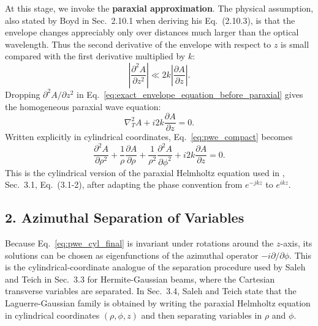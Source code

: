 \begin{resolucao}[Solution]
    At this stage, we invoke the \textbf{paraxial approximation}. The physical assumption, also stated by Boyd in Sec.~2.10.1 when deriving his Eq.~(2.10.3), is that the envelope changes appreciably only over distances much larger than the optical wavelength. Thus the second derivative of the envelope with respect to $z$ is small compared with the first derivative multiplied by $k$:
    \begin{equation}
        \left|
            \frac{\partial^2 A}{\partial z^2}
        \right|
        \ll
        2k
        \left|
            \frac{\partial A}{\partial z}
        \right|.
        \label{eq:paraxial_approximation}
    \end{equation}
    Dropping $\partial^2 A/\partial z^2$ in Eq.~\eqref{eq:exact_envelope_equation_before_paraxial} gives the homogeneous paraxial wave equation:
    \begin{equation}
        \nabla_T^2 A
        +
        i2k
        \frac{\partial A}{\partial z}
        =
        0.
        \label{eq:pwe_compact}
    \end{equation}
    Written explicitly in cylindrical coordinates, Eq.~\eqref{eq:pwe_compact} becomes
    \begin{equation}
        \frac{\partial^2 A}{\partial \rho^2}
        +
        \frac{1}{\rho}
        \frac{\partial A}{\partial \rho}
        +
        \frac{1}{\rho^2}
        \frac{\partial^2 A}{\partial \phi^2}
        +
        i2k
        \frac{\partial A}{\partial z}
        =
        0.
        \label{eq:pwe_cyl_final}
    \end{equation}
    This is the cylindrical version of the paraxial Helmholtz equation used in , Sec.~3.1, Eq.~(3.1-2), after adapting the phase convention from $e^{-jkz}$ to $e^{ikz}$.

\subsection*{2. Azimuthal Separation of Variables}

    Because Eq.~\eqref{eq:pwe_cyl_final} is invariant under rotations around the $z$-axis, its solutions can be chosen as eigenfunctions of the azimuthal operator $-i\partial/\partial\phi$. This is the cylindrical-coordinate analogue of the separation procedure used by Saleh and Teich in Sec.~3.3 for Hermite-Gaussian beams, where the Cartesian transverse variables are separated. In Sec.~3.4, Saleh and Teich state that the Laguerre-Gaussian family is obtained by writing the paraxial Helmholtz equation in cylindrical coordinates $(\rho,\phi,z)$ and then separating variables in $\rho$ and $\phi$.


\end{resolucao}
